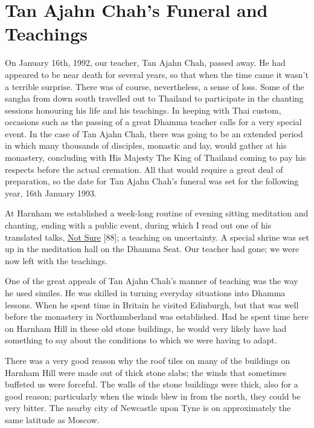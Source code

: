 \chapter{Tan Ajahn Chah's Funeral and Teachings}

On January 16th, 1992, our teacher, Tan Ajahn Chah, passed away. He had
appeared to be near death for several years, so that when the time came
it wasn't a terrible surprise. There was of course, nevertheless, a
sense of loss. Some of the sangha from down south travelled out to
Thailand to participate in the chanting sessions honouring his life and
his teachings. In keeping with Thai custom, occasions such as the
passing of a great Dhamma teacher calls for a very special event. In the
case of Tan Ajahn Chah, there was going to be an extended period in
which many thousands of disciples, monastic and lay, would gather at his
monastery, concluding with His Majesty The King of Thailand coming to
pay his respects before the actual cremation. All that would require a
great deal of preparation, so the date for Tan Ajahn Chah's funeral was
set for the following year, 16th January 1993.

At Harnham we established a week-long routine of evening sitting
meditation and chanting, ending with a public event, during which I read
out one of his translated talks,
\href{https://forestsangha.org/teachings/books/the-collected-teachings-of-ajahn-chah-single-volume?language=English}{\underline{Not
Sure}} {[}88{]}; a teaching on uncertainty. A special shrine was set up
in the meditation hall on the Dhamma Seat. Our teacher had gone; we were
now left with the teachings.

One of the great appeals of Tan Ajahn Chah's manner of teaching was the
way he used similes. He was skilled in turning everyday situations into
Dhamma lessons. When he spent time in Britain he visited Edinburgh, but
that was well before the monastery in Northumberland was established.
Had he spent time here on Harnham Hill in these old stone buildings, he
would very likely have had something to say about the conditions to
which we were having to adapt.

There was a very good reason why the roof tiles on many of the buildings
on Harnham Hill were made out of thick stone slabs; the winds that
sometimes buffeted us were forceful. The walls of the stone buildings
were thick, also for a good reason; particularly when the winds blew in
from the north, they could be very bitter. The nearby city of Newcastle
upon Tyne is on approximately the same latitude as Moscow.

